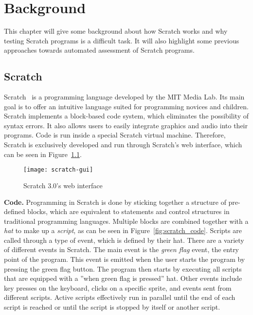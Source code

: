 \chapter{Background}%
\label{cha:background}

This chapter will give some background about how Scratch works and why testing Scratch programs is a difficult task.
It will also highlight some previous approaches towards automated assessment of Scratch programs.

\section{Scratch}%
\label{sec:scratch}

Scratch~\cite{scratch} is a programming language developed by the MIT Media Lab.
Its main goal is to offer an intuitive language suited for programming novices and children.
Scratch implements a block-based code system, which eliminates the possibility of syntax errors.
It also allows users to easily integrate graphics and audio into their programs.
Code is run inside a special Scratch virtual machine.
Therefore, Scratch is exclusively developed and run through Scratch's web interface, which can be seen in Figure~\ref{fig:scratch_gui}.
\parspace

\begin{figure}[htpb]
    \centering
    \texttt{[image: scratch-gui]}
    \caption{Scratch 3.0's web interface}
    \label{fig:scratch_gui}
\end{figure}

\textbf{Code.}
Programming in Scratch is done by sticking together a structure of pre-defined blocks, which are equivalent to statements and control
structures in traditional programming languages.
Multiple blocks are combined together with a \textit{hat} to make up a \textit{script}, as can be seen in Figure~\ref{fig:scratch_code}.
Scripts are called through a type of event, which is defined by their hat.
There are a variety of different events in Scratch.
The main event is the \textit{green flag} event, the entry point of the program.
This event is emitted when the user starts the program by pressing the green flag button.
The program then starts by executing all scripts that are equipped with a ''when green flag is pressed'' hat.
Other events include key presses on the keyboard, clicks on a specific sprite, and events sent from different scripts.
Active scripts effectively run in parallel until the end of each script is reached or until the script is stopped by itself or another script.
\parspace

